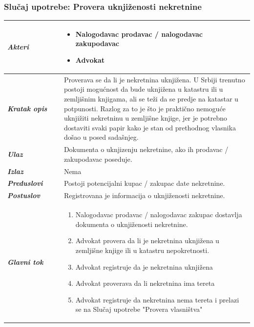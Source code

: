 \documentclass[20pt]{article}
\begin{document}
\subsubsection{\bfseries \large Slu\v{c}aj upotrebe: Provera uknji\v zenosti nekretnine}
\begin{center}
\begin{tabular}{p{0.23\linewidth} p{0.77\linewidth}}
 \hline
 {\it \bfseries Akteri} & \begin{itemize}
    \item Nalogodavac prodavac / nalogodavac zakupodavac
    \item Advokat
\end{itemize}\\
\hline

 {\it \bfseries Kratak opis} & Proverava se da li je nekretnina uknji\v zena. U Srbiji trenutno postoji mogu\' cnost da bude uknji\v zena u katastru ili u zemlji\v snim knjigama, ali se te\v zi da se predje na katastar u potpunosti. Razlog za to je \v sto je prakti\v cno nemogu\' ce uknji\v ziti nekretninu u zemlji\v sne knjige, jer je potrebno dostaviti svaki papir kako je stan od prethodnog vlasnika do\v sao u posed sada\v snjeg.\\ 
 \hline
 
 {\it \bfseries Ulaz} & Dokumenta o uknjizenju nekretnine, ako ih prodavac / zakupodavac poseduje.\\ 
 \hline
 
 {\it \bfseries Izlaz} & Nema\\
 \hline
 
 {\it \bfseries Preduslovi} & Postoji potencijalni kupac / zakupac date nekretnine.\\
 \hline

 {\it \bfseries Postuslov} & Registrovana je informacija o uknji\v zenosti nekretnine.\\
 \hline

     {\it \bfseries Glavni tok} &  
     \begin{enumerate}
        \item Nalogodavac prodavac / nalogodavac zakupac dostavlja dokumenta o uknji\v zenosti nekretnine.
        \item Advokat provera da li je nekretnina uknji\v zena u zemlji\v sne knjige ili u katastru nepokretnosti.
        \item Advokat registruje da je nekretnina uknji\v zena 
        \item Advokat proverava da li nekretnina ima tereta 
        \item Advokat registruje da nekretnina nema tereta i prelazi se na Slu\v{c}aj upotrebe "Provera vlasni\v stva"
    \end{enumerate}\\
 \hline

\end{tabular}
\end{center}
\end{document}

